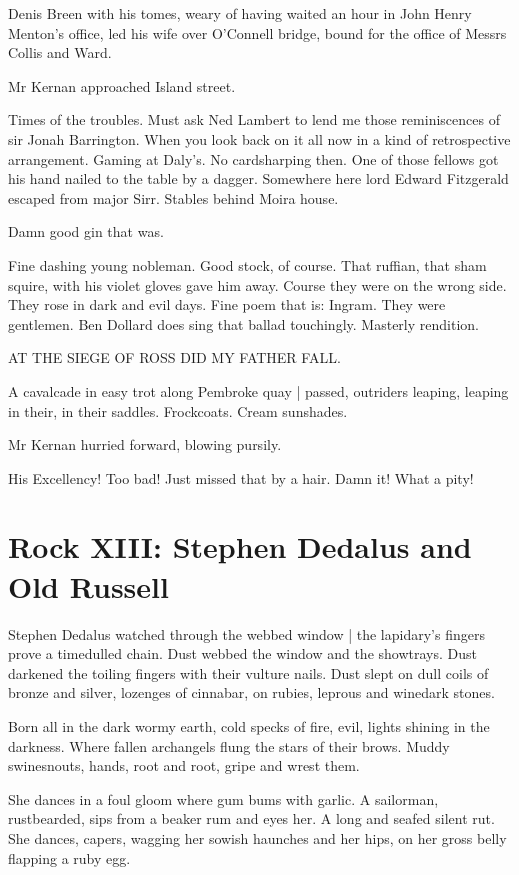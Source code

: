 Denis Breen with his tomes,
weary of having waited an hour in John Henry Menton's office,
led his wife over O'Connell bridge,
bound for the office
of Messrs Collis and Ward.

Mr Kernan approached Island street.

Times of the troubles.
Must ask Ned Lambert to lend me
those
reminiscences of sir Jonah Barrington.
When you look back on it all now
in a kind of retrospective arrangement.
Gaming at Daly's.
No cardsharping
then.
One of those fellows got his hand nailed to the table by a dagger.
Somewhere here lord Edward Fitzgerald escaped from major Sirr.
Stables
behind Moira house.

Damn good gin that was.

Fine dashing young nobleman.
Good stock, of course.
That ruffian, that sham squire, with his violet gloves
gave him away.
Course they were on the wrong side.
They rose in dark and evil days.
Fine poem that is:
Ingram.
They were gentlemen.
Ben Dollard does sing that ballad touchingly.
Masterly rendition.


    AT THE SIEGE OF ROSS DID MY FATHER FALL.


A cavalcade in easy trot along Pembroke quay |
passed,
outriders leaping, leaping in their, in their saddles.
Frockcoats.
Cream sunshades.

Mr Kernan hurried forward,
blowing pursily.

His Excellency!
Too bad!
Just missed that by a hair.
Damn it!
What a pity!


\section*{Rock XIII: Stephen Dedalus and Old Russell}


Stephen Dedalus watched through the webbed window |
the lapidary's fingers prove a timedulled chain.
Dust webbed the window and the showtrays.
Dust darkened the toiling fingers with their vulture nails.
Dust slept on dull coils of bronze and silver,
lozenges of cinnabar,
on rubies,
leprous and winedark stones.

Born all in the dark wormy earth,
cold specks of fire,
evil, lights shining in the darkness.
Where fallen archangels flung the stars of their brows.
Muddy swinesnouts,
hands,
root and root,
gripe and wrest them.

She dances in a foul gloom where gum bums with garlic.
A sailorman, rustbearded, sips from a beaker rum and eyes her.
A long and seafed silent rut.
She dances, capers,
wagging her sowish haunches and her hips,
on her gross belly flapping a ruby egg.

